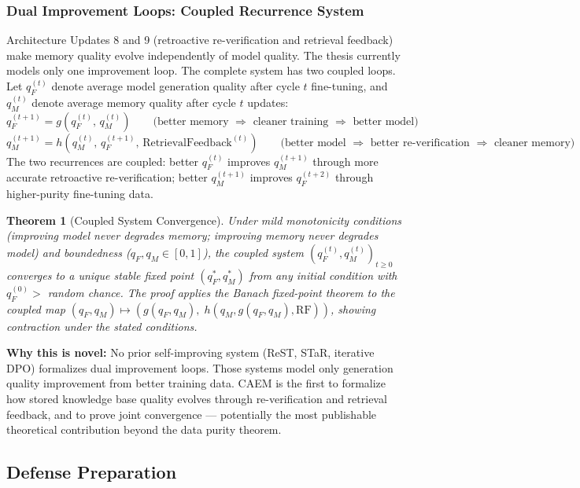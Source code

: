 \documentclass[12pt,a4paper]{article}
\newtheorem{theorem}{Theorem}[section]
\theoremstyle{definition}
\begin{document}
\subsubsection{Dual Improvement Loops: Coupled Recurrence System}

Architecture Updates 8 and 9 (retroactive re-verification and retrieval feedback) make memory quality evolve independently of model quality. The thesis currently models only one improvement loop. The complete system has two coupled loops. Let $q_F^{(t)}$ denote average model generation quality after cycle $t$ fine-tuning, and $q_M^{(t)}$ denote average memory quality after cycle $t$ updates:
\[
q_F^{(t+1)} = g\!\left(q_F^{(t)},\, q_M^{(t)}\right) \qquad \text{(better memory $\Rightarrow$ cleaner training $\Rightarrow$ better model)}
\]
\[
q_M^{(t+1)} = h\!\left(q_M^{(t)},\, q_F^{(t+1)},\, \text{RetrievalFeedback}^{(t)}\right) \qquad \text{(better model $\Rightarrow$ better re-verification $\Rightarrow$ cleaner memory)}
\]
The two recurrences are coupled: better $q_F^{(t)}$ improves $q_M^{(t+1)}$ through more accurate retroactive re-verification; better $q_M^{(t+1)}$ improves $q_F^{(t+2)}$ through higher-purity fine-tuning data.

\begin{theorem}[Coupled System Convergence]
Under mild monotonicity conditions (improving model never degrades memory; improving memory never degrades model) and boundedness ($q_F, q_M \in [0,1]$), the coupled system $(q_F^{(t)}, q_M^{(t)})_{t \geq 0}$ converges to a unique stable fixed point $(q_F^*, q_M^*)$ from any initial condition with $q_F^{(0)} > $ random chance. The proof applies the Banach fixed-point theorem to the coupled map $(q_F, q_M) \mapsto (g(q_F, q_M),\; h(q_M, g(q_F, q_M), \text{RF}))$, showing contraction under the stated conditions.
\end{theorem}

\textbf{Why this is novel:} No prior self-improving system (ReST, STaR, iterative DPO) formalizes dual improvement loops. Those systems model only generation quality improvement from better training data. CAEM is the first to formalize how stored knowledge base quality evolves through re-verification and retrieval feedback, and to prove joint convergence — potentially the most publishable theoretical contribution beyond the data purity theorem.

\subsection{Defense Preparation}
\end{document}
